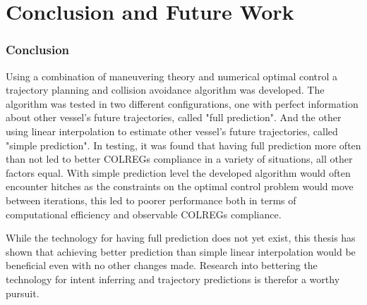 \blankpage
\section{Conclusion and Future Work}

\subsubsection*{Conclusion}


Using a combination of maneuvering theory and numerical optimal control a trajectory planning and collision avoidance
algorithm was developed. The algorithm was tested in two different configurations, one with perfect information about
other vessel's future trajectories, called "full prediction". And the other using linear interpolation to estimate other vessel's future trajectories, called "simple prediction".
In testing, it was found that having full prediction more often than not led to better COLREGs compliance in a variety of situations, all other factors equal.
With simple prediction level the developed algorithm would often encounter hitches as the constraints on the optimal control problem would move between iterations,
this led to poorer performance both in terms of computational efficiency and observable COLREGs compliance.

While the technology for having full prediction does not yet exist, this thesis has shown that achieving better prediction than simple linear interpolation
would be beneficial even with no other changes made. Research into bettering the technology for intent inferring and trajectory predictions is therefor
a worthy pursuit.

